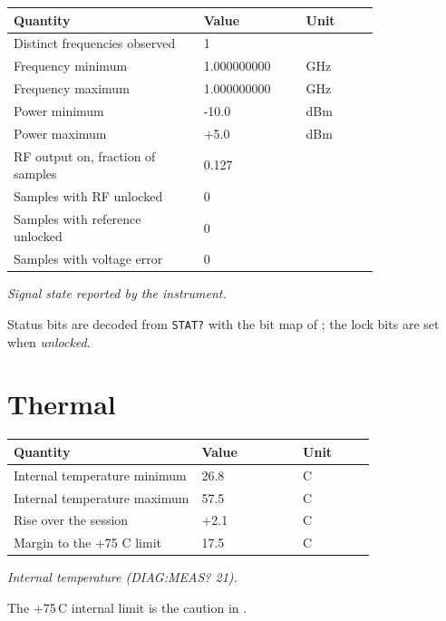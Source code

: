 \documentclass[11pt]{article}
\begin{document}
\begin{center}
\begin{tabular}{@{}p{0.52\linewidth}p{0.28\linewidth}l@{}}
\toprule
\textbf{Quantity} & \textbf{Value} & \textbf{Unit} \\
\midrule
Distinct frequencies observed & 1 &  \\
Frequency minimum & 1.000000000 & GHz \\
Frequency maximum & 1.000000000 & GHz \\
Power minimum & -10.0 & dBm \\
Power maximum & +5.0 & dBm \\
RF output on, fraction of samples & 0.127 &  \\
Samples with RF unlocked & 0 &  \\
Samples with reference unlocked & 0 &  \\
Samples with voltage error & 0 &  \\
\bottomrule
\end{tabular}

\emph{Signal state reported by the instrument.}
\end{center}

Status bits are decoded from \texttt{STAT?} with the bit map of
\cite[Table 5]{nicomms}; the lock bits are set when \emph{unlocked}.

\section{Thermal}

\begin{center}
\begin{tabular}{@{}p{0.52\linewidth}p{0.28\linewidth}l@{}}
\toprule
\textbf{Quantity} & \textbf{Value} & \textbf{Unit} \\
\midrule
Internal temperature minimum & 26.8 & \textdegree{}C \\
Internal temperature maximum & 57.5 & \textdegree{}C \\
Rise over the session & +2.1 & \textdegree{}C \\
Margin to the +75 \textdegree{}C limit & 17.5 & \textdegree{}C \\
\bottomrule
\end{tabular}

\emph{Internal temperature (DIAG:MEAS? 21).}
\end{center}

The +75\,\textdegree{}C internal limit is the caution in \cite{niguide}.
\end{document}
